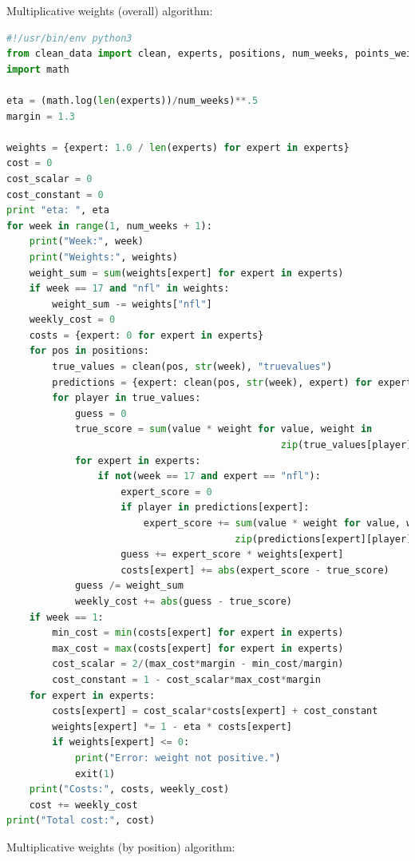 \documentclass[12pt, final, onecolumn, titlepage]{article}
\theoremstyle{definition}
\begin{document}
\normalsize
\noindent Multiplicative weights (overall) algorithm:

\footnotesize
\begin{lstlisting}[basicstyle=\small\ttfamily,breaklines=true,breakatwhitespace=true,language=Python]
#!/usr/bin/env python3
from clean_data import clean, experts, positions, num_weeks, points_weights
import math

eta = (math.log(len(experts))/num_weeks)**.5
margin = 1.3

weights = {expert: 1.0 / len(experts) for expert in experts}
cost = 0
cost_scalar = 0
cost_constant = 0
print "eta: ", eta
for week in range(1, num_weeks + 1):
    print("Week:", week)
    print("Weights:", weights)
    weight_sum = sum(weights[expert] for expert in experts)
    if week == 17 and "nfl" in weights:
        weight_sum -= weights["nfl"]
    weekly_cost = 0
    costs = {expert: 0 for expert in experts}
    for pos in positions:
        true_values = clean(pos, str(week), "truevalues")
        predictions = {expert: clean(pos, str(week), expert) for expert in experts}
        for player in true_values:
            guess = 0
            true_score = sum(value * weight for value, weight in
                                                zip(true_values[player], points_weights))
            for expert in experts:
                if not(week == 17 and expert == "nfl"):
                    expert_score = 0
                    if player in predictions[expert]:
                        expert_score += sum(value * weight for value, weight in
                                        zip(predictions[expert][player], points_weights))
                    guess += expert_score * weights[expert]
                    costs[expert] += abs(expert_score - true_score)
            guess /= weight_sum
            weekly_cost += abs(guess - true_score)
    if week == 1:
        min_cost = min(costs[expert] for expert in experts)
        max_cost = max(costs[expert] for expert in experts)
        cost_scalar = 2/(max_cost*margin - min_cost/margin)
        cost_constant = 1 - cost_scalar*max_cost*margin
    for expert in experts:
        costs[expert] = cost_scalar*costs[expert] + cost_constant
        weights[expert] *= 1 - eta * costs[expert]
        if weights[expert] <= 0:
            print("Error: weight not positive.")
            exit(1)
    print("Costs:", costs, weekly_cost)
    cost += weekly_cost
print("Total cost:", cost)
\end{lstlisting}

\normalsize
\noindent Multiplicative weights (by position) algorithm:
\end{document}
